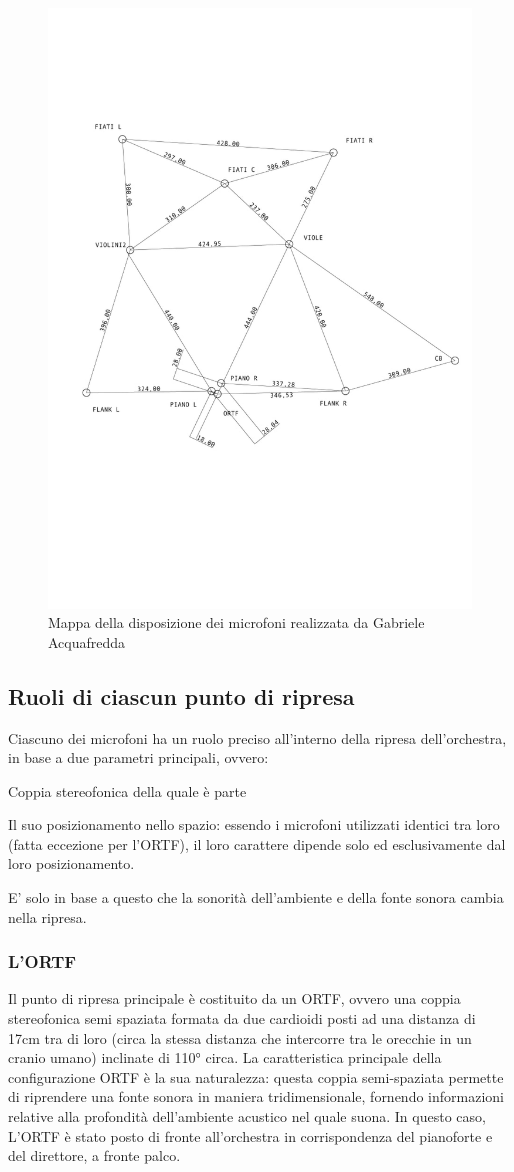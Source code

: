 \begin{figure}[t]
	\centering
	\includegraphics[width=.47\textwidth]{img/image2.jpg}
	\caption{Mappa della disposizione dei microfoni realizzata da Gabriele Acquafredda}
	\label{gs}
\end{figure}

\subsection*{Ruoli di ciascun punto di ripresa}
Ciascuno dei microfoni ha un ruolo preciso all'interno della ripresa dell'orchestra, in base a due parametri principali, ovvero:
\begin{compactitem}
\item Coppia stereofonica della quale è parte
\item Il suo posizionamento nello spazio: essendo i microfoni utilizzati identici tra loro (fatta eccezione per l'ORTF), il loro carattere dipende solo ed esclusivamente dal loro posizionamento.
\end{compactitem}
E' solo in base a questo che la sonorità dell'ambiente e della fonte sonora cambia nella ripresa.

\subsubsection*{L'ORTF}
Il punto di ripresa principale è costituito da un ORTF, ovvero una coppia stereofonica semi spaziata formata da due cardioidi posti ad una distanza di 17cm tra di loro (circa la stessa distanza che intercorre tra le orecchie in un cranio umano) inclinate di 110° circa.
La caratteristica principale della configurazione ORTF è la sua naturalezza: questa coppia semi-spaziata permette di riprendere una fonte sonora in maniera tridimensionale, fornendo informazioni relative alla profondità dell'ambiente acustico nel quale suona.
In questo caso, L'ORTF è stato posto di fronte all'orchestra in corrispondenza del pianoforte e del direttore, a fronte palco.

